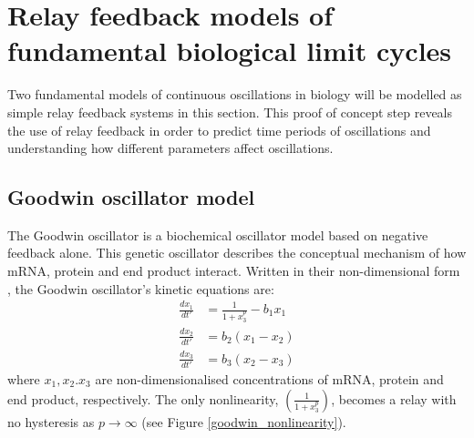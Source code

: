\documentclass[a4paper, 12pt]{article}
\begin{document}
\FloatBarrier
\section{Relay feedback models of fundamental biological limit cycles}\label{Sec:continous oscillations}
Two fundamental models of continuous oscillations in biology will be modelled as simple relay feedback systems in this section. This proof of concept step reveals the use of relay feedback in order to predict time periods of oscillations and understanding how different parameters affect oscillations. 

\subsection{Goodwin oscillator model}
The Goodwin oscillator is a biochemical oscillator model based on negative feedback alone. This genetic oscillator describes the conceptual mechanism of how mRNA, protein and end product interact. Written in their non-dimensional form \cite{fall}, the Goodwin oscillator's kinetic equations are:
\begin{align}
\frac{dx_1}{dt'} &= \frac{1}{1 + x_3^p} - b_1x_1 \\
\frac{dx_2}{dt'} &= b_2(x_1 - x_2) \\
\frac{dx_3}{dt'} &= b_3(x_2 - x_3)
\end{align}
where $x_1,x_2.x_3$ are non-dimensionalised concentrations of mRNA, protein and end product, respectively. 
\noindent The only nonlinearity, $(\frac{1}{1 + x_3^p})$, becomes a relay with no hysteresis as $p \rightarrow \infty$ (see Figure \ref{goodwin_nonlinearity}).
\end{document}
